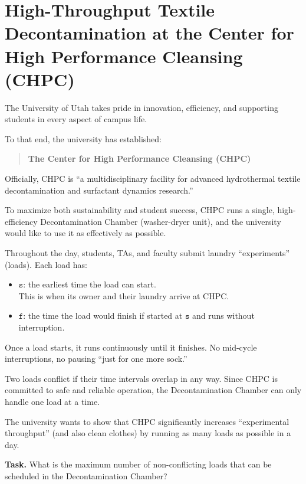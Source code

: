 \section*{High-Throughput Textile Decontamination at the Center for High Performance Cleansing (CHPC)}

The University of Utah takes pride in innovation, efficiency, and supporting
students in every aspect of campus life.

To that end, the university has established:
\begin{quote}
\textbf{The Center for High Performance Cleansing (CHPC)}
\end{quote}

Officially, CHPC is ``a multidisciplinary facility for advanced hydrothermal
textile decontamination and surfactant dynamics research.''

To maximize both sustainability and student success, CHPC runs a single,
high-efficiency Decontamination Chamber (washer-dryer unit), and the university
would like to use it as effectively as possible.

Throughout the day, students, TAs, and faculty submit laundry ``experiments''
(loads). Each load has:
\begin{itemize}
    \item \(\texttt{s}\): the earliest time the load can start.\\
    This is when its owner and their laundry arrive at CHPC.
    \item \(\texttt{f}\): the time the load would finish if started at
    \(\texttt{s}\) and runs without interruption.
\end{itemize}

Once a load starts, it runs continuously until it finishes. No mid-cycle
interruptions, no pausing ``just for one more sock.''

Two loads conflict if their time intervals overlap in any way. Since CHPC is
committed to safe and reliable operation, the Decontamination Chamber can only
handle one load at a time.

The university wants to show that CHPC significantly increases ``experimental
throughput'' (and also clean clothes) by running as many loads as possible in a
day.

\medskip

\noindent
\textbf{Task.} What is the maximum number of non-conflicting loads that can be
scheduled in the Decontamination Chamber?
